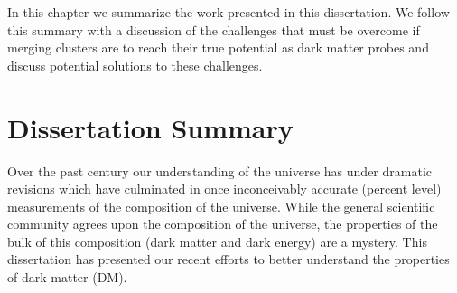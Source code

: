 \label{chapter:5}

In this chapter we summarize the work presented in this dissertation.  We follow this summary with a discussion of the challenges that must be overcome if merging clusters are to reach their true potential as dark matter probes and discuss potential solutions to these challenges.

\section{Dissertation Summary}

Over the past century our understanding of the universe has under dramatic revisions which have culminated in once inconceivably accurate (percent level) measurements of the composition of the universe.
While the general scientific community agrees upon the composition of the universe, the properties of the bulk of this composition (dark matter and dark energy) are a mystery.
This dissertation has presented our recent efforts to better understand the properties of dark matter (DM).

